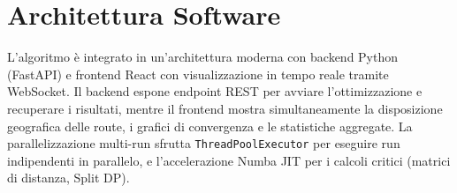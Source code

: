 \section{Architettura Software}

L'algoritmo \`e integrato in un'architettura moderna con backend Python (FastAPI)\cite{fastapi} e
frontend React con visualizzazione in tempo reale tramite WebSocket. Il backend espone
endpoint REST per avviare l'ottimizzazione e recuperare i risultati, mentre il frontend
mostra simultaneamente la disposizione geografica delle route, i grafici di convergenza
e le statistiche aggregate. La parallelizzazione multi-run sfrutta \texttt{ThreadPoolExecutor}
per eseguire run indipendenti in parallelo, e l'accelerazione Numba JIT \cite{lam2015numba} per i calcoli
critici (matrici di distanza, Split DP).
